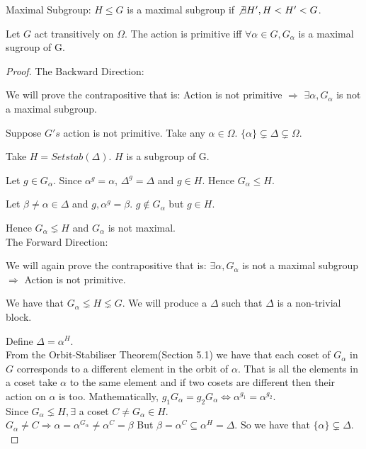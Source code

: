
\begin{defn}{Maximal Subgroup:}
$H \leq G$ is a maximal subgroup if $\not \exists H',H < H' < G$.
\end{defn}

\begin{lemma}
Let $G$ act transitively on $\Omega$. The action is primitive iff $\forall \alpha \in G, G_\alpha$ is a maximal sugroup of G. 
\end{lemma}

\begin{proof}
The Backward Direction:

We will prove the contrapositive that is: Action is not primitive $\Rightarrow$ $\exists \alpha, G_\alpha$ is not a maximal subgroup.

Suppose $G's$ action is not primitive. Take any $\alpha \in \Omega$. $\{\alpha\} \subsetneq \Delta \subsetneq \Omega$. 

Take $H = Setstab(\Delta)$. $H$ is a subgroup of G.

Let $g \in G_\alpha$. Since $\alpha^g = \alpha$, $\Delta^g = \Delta$ and $g \in H$. Hence $G_\alpha \leq H$.

Let $\beta \neq \alpha \in \Delta$ and $g, \alpha^g = \beta$. $g \notin G_\alpha$ but $g \in H$. 

Hence $G_\alpha \lneq H$ and $G_\alpha$ is not maximal. \\

The Forward Direction:

We will again prove the contrapositive that is: $\exists \alpha, G_\alpha$ is not a maximal subgroup $\Rightarrow$ Action is not primitive.

We have that $G_\alpha \lneq H \lneq G$. We will produce a $\Delta$ such that $\Delta$ is a non-trivial block.


Define $\Delta = \alpha^H$. \\

From the Orbit-Stabiliser Theorem(Section 5.1) we have that each coset of $G_\alpha$ in $G$ corresponds to a different element in the orbit of $\alpha$. That is all the elements in a coset take $\alpha$ to the same element and if two cosets are different then their action on $\alpha$ is too. Mathematically, $g_1G_\alpha = g_2G_\alpha \Leftrightarrow \alpha^{g_1} = \alpha^{g_2}$.\\

Since $G_\alpha \lneq H,\exists$ a coset $C \neq G_\alpha \in H$. \\$G_\alpha \neq C \Rightarrow \alpha = \alpha^{G_\alpha} \not = \alpha^C = \beta$ But $\beta = \alpha^C \subseteq \alpha^H = \Delta$. So we have that $\{\alpha\} \subsetneq \Delta$. \\


\end{proof}
